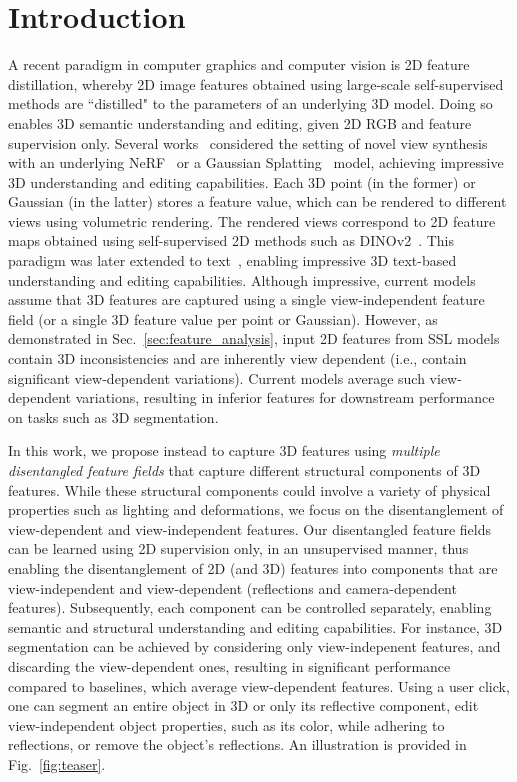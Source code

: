 \section{Introduction}
\label{sec:intro}


A recent paradigm in computer graphics and computer vision is 2D feature distillation, whereby 2D image features obtained using large-scale self-supervised methods are ``distilled" to the parameters of an underlying 3D model. Doing so enables 3D semantic understanding and editing, given 2D RGB and feature supervision only. Several works~\cite{kobayashi2022decomposing, kerr2023lerf, ye2023featurenerf} considered the setting of novel view synthesis with an underlying NeRF~\cite{mildenhall2021nerf} or a Gaussian Splatting~\cite{kerbl20233dgd} model, achieving impressive 3D understanding and editing capabilities. Each 3D point (in the former) or Gaussian (in the latter) stores a feature value, which can be rendered to different views using volumetric rendering. The rendered views correspond to 2D feature maps obtained using self-supervised 2D methods such as DINOv2~\cite{oquab2023dinov2}. This paradigm was later extended to text~\cite{kerr2023lerf, qin2023langsplat}, enabling impressive 3D text-based understanding and editing capabilities.
Although impressive, current models assume that 3D features are captured using a single view-independent feature field (or a single 3D feature value per point or Gaussian). However, as demonstrated in Sec.~\ref{sec:feature_analysis}, input 2D features from SSL models contain 3D inconsistencies and are inherently view dependent (i.e., contain significant view-dependent variations). Current models average such view-dependent variations, resulting in inferior features for downstream performance on tasks such as 3D segmentation. 

In this work, we propose instead to capture 3D features using \textit{multiple disentangled feature fields} that capture different structural components of 3D features. While these structural components could involve a variety of physical properties such as lighting and deformations, we focus on the disentanglement of view-dependent and view-independent features. 
Our disentangled feature fields can be learned using 2D supervision only, in an unsupervised manner, thus enabling the disentanglement of 2D (and 3D) features into components that are view-independent and view-dependent (reflections and camera-dependent features). Subsequently, each component can be controlled separately, enabling semantic and structural understanding and editing capabilities. 
For instance, 3D segmentation can be achieved by considering only view-indepenent features, and discarding the view-dependent ones, resulting in significant performance compared to baselines, which average view-dependent features. 
Using a user click, one can segment an entire object in 3D or only its reflective component, edit view-independent object properties, such as its color, while adhering to reflections, or remove the object's reflections. An illustration is provided in Fig.~\ref{fig:teaser}. 








